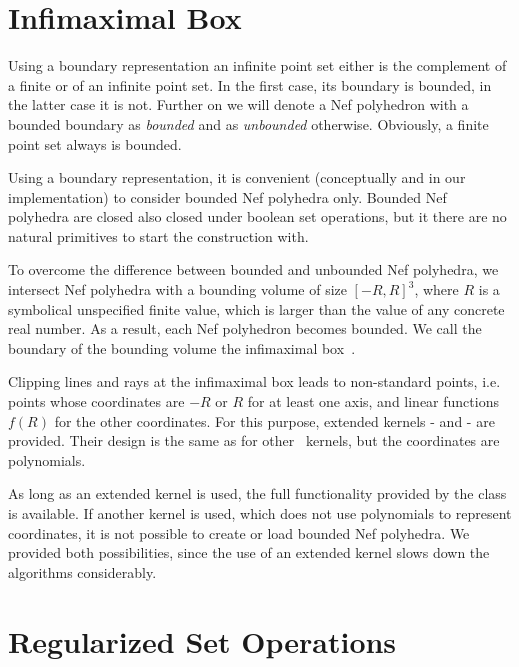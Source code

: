 \section{Infimaximal Box}
\label{sectionNef_3InfiBox}

Using a boundary representation an infinite point set either is the complement
of a finite or of an infinite point set. In the first case, its boundary is
bounded, in the latter case it is not. Further on we will denote a Nef polyhedron
with a bounded boundary as \emph{bounded} and as \emph{unbounded} otherwise.
Obviously, a finite point set always is bounded.

Using a boundary representation, it is convenient
(conceptually and in our implementation) to consider bounded Nef polyhedra only.
Bounded Nef polyhedra are closed also closed under boolean set operations, but
it there are no natural primitives to start the construction with. 

To overcome the difference between bounded and 
unbounded Nef polyhedra, we intersect Nef polyhedra with a
bounding volume of size $[-R,R]^3$, where $R$ is a symbolical unspecified finite 
value, which is larger than the value of any concrete real number. As a result,
each Nef polyhedron becomes bounded.
We call the boundary of the bounding volume the infimaximal 
box~\cite{cgal:sm-iftml-00}.

Clipping lines and rays at the infimaximal box leads to non-standard points,
i.e. points whose coordinates are $-R$ or $R$ for at least one axis, and
linear functions $f(R)$ for the other coordinates. For this purpose, extended
kernels -  and  - are provided. 
Their design is the same as for other \cgal\ kernels, but the coordinates are
polynomials.

As long as an extended kernel is used, the full functionality provided 
by the class  is available. If another kernel is
used, which does not use polynomials to represent coordinates, it is not
possible to create or load bounded Nef polyhedra. We provided both 
possibilities, since the use of an extended kernel slows down the algorithms
considerably.

\section{Regularized Set Operations}

